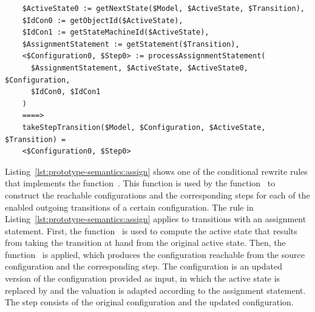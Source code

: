 \begin{listing}
  \lstset{
    language=asf,
    style=asf,
    caption=Computing the configuration that is reached after executing an assignment,
    label=lst:prototype-semantics:assign,
    numbers=none
  }
  \begin{lstlisting}
    $ActiveState0 := getNextState($Model, $ActiveState, $Transition),
    $IdCon0 := getObjectId($ActiveState),
    $IdCon1 := getStateMachineId($ActiveState),
    $AssignmentStatement := getStatement($Transition),
    <$Configuration0, $Step0> := processAssignmentStatement(
      $AssignmentStatement, $ActiveState, $ActiveState0, $Configuration,
      $IdCon0, $IdCon1
    )
    ====>
    takeStepTransition($Model, $Configuration, $ActiveState, $Transition) =
    <$Configuration0, $Step0>
  \end{lstlisting}
\end{listing}

Listing~\ref{lst:prototype-semantics:assign} shows one of the conditional rewrite rules that implements the function~.
This function is used by the function~ to construct the reachable configurations and the corresponding steps for each of the enabled outgoing transitions of a certain configuration.
The rule in Listing~\ref{lst:prototype-semantics:assign} applies to transitions with an assignment statement.
First, the function~ is used to compute the active state that results from taking the transition at hand from the original active state.
Then, the function~ is applied, which produces the configuration reachable from the source configuration and the corresponding step.
The configuration is an updated version of the configuration provided as input, in which the active state  is replaced by  and the valuation is adapted according to the assignment statement.
The step consists of the original configuration and the updated configuration.


